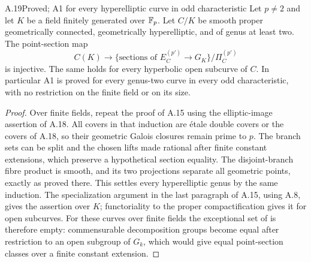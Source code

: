 \begin{claim}{A.19}{Proved; A1 for every hyperelliptic curve in odd characteristic}
Let $p\ne2$ and let $K$ be a field finitely generated over
$\mathbb F_p$. Let $C/K$ be smooth proper geometrically connected,
geometrically hyperelliptic, and of genus at least two.
The point-section map
\[
 C(K)\longrightarrow
 \{\text{sections of }E_C^{(p')}\to G_K\}/\Pi_C^{(p')}
\]
is injective. The same holds for every hyperbolic open
subcurve of $C$. In particular A1 is proved for every
genus-two curve in every odd characteristic, with no
restriction on the finite field or on its size.
\end{claim}
\begin{proof}
Over finite fields, repeat the proof of A.15 using the
elliptic-image assertion of A.18. All covers in that
induction are \'etale double covers or the covers of A.18,
so their geometric Galois closures remain prime to $p$.
The branch sets can be split and the chosen lifts made
rational after finite constant extensions, which preserve
a hypothetical section equality. The disjoint-branch
fibre product is smooth, and its two projections separate
all geometric points, exactly as proved there. This
settles every hyperelliptic genus by the same induction.
The specialization argument in the last paragraph of
A.15, using A.8, gives the assertion over $K$; functoriality
to the proper compactification gives it for open subcurves.
For these curves over finite fields the exceptional set of
\citet[Proposition 1.8]{A_SaidiTamagawa2009} is therefore empty:
commensurable decomposition groups become equal after
restriction to an open subgroup of $G_k$, which would give
equal point-section classes over a finite constant extension.
\end{proof}

